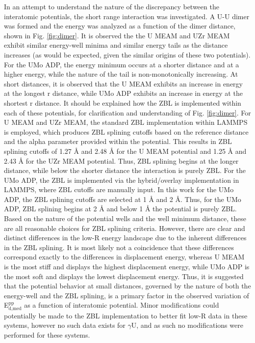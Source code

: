 \documentclass[review]{elsarticle}
\begin{document}
In an attempt to understand the nature of the discrepancy between the interatomic potentials, the short range interaction was investigated. A U-U dimer was formed and the energy was analyzed as a function of the dimer distance, shown in Fig. \ref{fig:dimer}. It is observed the the U MEAM and UZr MEAM exhibit similar energy-well minima and similar energy tails as the distance increases (as would be expected, given the similar origins of these two potentials). For the UMo ADP, the energy minimum occurs at a shorter distance and at a higher energy, while the nature of the tail is non-monotonically increasing. At short distances, it is observed that the U MEAM exhibits an increase in energy at the longest r distance, while UMo ADP exhibits an increase in energy at the shortest r distance. It should be explained how the ZBL is implemented within each of these potentials, for clarification and understanding of Fig. \ref{fig:dimer}. For U MEAM and UZr MEAM, the standard ZBL implementation within LAMMPS is employed, which produces ZBL splining cutoffs based on the reference distance and the alpha parameter provided within the potential. This results in ZBL splining cutoffs of 1.27 {\AA} and 2.48 {\AA} for the U MEAM potential and 1.25 {\AA} and 2.43 {\AA} for the UZr MEAM potential. Thus, ZBL splining begins at the longer distance, while below the shorter distance the interaction is purely ZBL. For the UMo ADP, the ZBL is implemented via the hybrid/overlay implementation in LAMMPS, where ZBL cutoffs are manually input. In this work for the UMo ADP, the ZBL splining cutoffs are selected at 1 {\AA} and 2 {\AA}. Thus, for the UMo ADP, ZBL splining begins at 2 {\AA} and below 1 {\AA} the potential is purely ZBL. Based on the nature of the potential wells and the well minimum distance, these are all reasonable choices for ZBL splining criteria. However, there are clear and distinct differences in the low-R energy landscape due to the inherent differences in the ZBL splining. It is most likely not a coincidence that these differences correspond exactly to the differences in displacement energy, whereas U MEAM is the most stiff and displays the highest displacement energy, while UMo ADP is the most soft and displays the lowest displacement energy. Thus, it is suggested that the potential behavior at small distances, governed by the nature of both the energy-well and the ZBL splining, is a primary factor in the observed variation of E$^{\textrm{pp}}_{\textrm{d,med}}$ as a function of interatomic potential. Minor modifications could potentially be made to the ZBL implementation to better fit low-R data in these systems, however no such data exists for $\gamma$U, and as such no modifications were performed for these systems.
\end{document}
